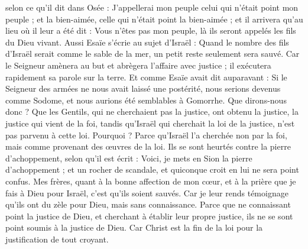 \begin{multicols}{2}
selon ce qu'il dit dans Osée : J'appellerai mon peuple celui qui n'était point mon peuple ; et la bien-aimée, celle qui n'était point la bien-aimée ;
et il arrivera qu'au lieu où il leur a été dit : Vous n'êtes pas mon peuple, là ils seront appelés les fils du Dieu vivant.
Aussi Esaïe s'écrie au sujet d'Israël : Quand le nombre des fils d'Israël serait comme le sable de la mer, un petit reste seulement sera sauvé.
Car le Seigneur amènera au but et abrègera l'affaire avec justice ; il exécutera rapidement sa parole sur la terre.
Et comme Esaïe avait dit auparavant : Si le Seigneur des armées ne nous avait laissé une postérité, nous serions devenus comme Sodome, et nous aurions été semblables à Gomorrhe.
Que dirons-nous donc ? Que les Gentils, qui ne cherchaient pas la justice, ont obtenu la justice, la justice qui vient de la foi,
tandis qu'Israël qui cherchait la loi de la justice, n'est pas parvenu à cette loi.
Pourquoi ? Parce qu'Israël l'a cherchée non par la foi, mais comme provenant des œuvres de la loi. Ils se sont heurtés contre la pierre d'achoppement,
selon qu'il est écrit : Voici, je mets en Sion la pierre d'achoppement ; et un rocher de scandale, et quiconque croit en lui ne sera point confus.
\VerseOne{}Mes frères, quant à la bonne affection de mon cœur, et à la prière que je fais à Dieu pour Israël, c'est qu'ils soient sauvés.
Car je leur rends témoignage qu'ils ont du zèle pour Dieu, mais sans connaissance.
Parce que ne connaissant point la justice de Dieu, et cherchant à établir leur propre justice, ils ne se sont point soumis à la justice de Dieu.
Car Christ est la fin de la loi pour la justification de tout croyant.

\end{multicols}
